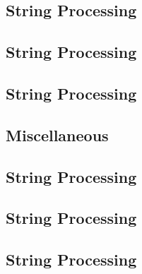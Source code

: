\subsection{String Processing}
\raggedbottom
\vspace{-.7\baselineskip}\hrulefill
\vspace{0.1\baselineskip}\subsection{String Processing}
\raggedbottom
\vspace{-.7\baselineskip}\hrulefill
\vspace{0.1\baselineskip}\subsection{String Processing}
\raggedbottom
\vspace{-.7\baselineskip}\hrulefill
\vspace{0.1\baselineskip}\subsection{Miscellaneous}
\raggedbottom
\vspace{-.7\baselineskip}\hrulefill
\vspace{0.1\baselineskip}\subsection{String Processing}
\raggedbottom
\vspace{-.7\baselineskip}\hrulefill
\vspace{0.1\baselineskip}\subsection{String Processing}
\raggedbottom
\vspace{-.7\baselineskip}\hrulefill
\vspace{0.1\baselineskip}\subsection{String Processing}
